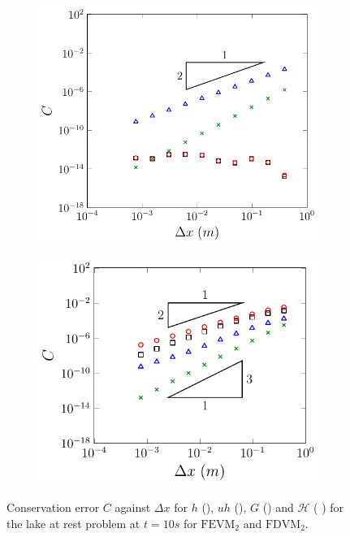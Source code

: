 \begin{figure}
\begin{subfigure}{0.5\textwidth}
		\vspace{0.5cm}
	\end{subfigure}
	\begin{subfigure}{0.5\textwidth}
		\includegraphics[width=\textwidth]{./chp5/figures/Analytic/LakeAtRest/C1/Ana/FDVM2WB.pdf}
	\end{subfigure}%
	\begin{subfigure}{0.5\textwidth}
		\includegraphics[width=\textwidth]{./chp5/figures/Analytic/LakeAtRest/C1/Ana/FDVM2nWB.pdf}
	\end{subfigure}
	\caption{Conservation error $C$ against $\Delta x$ for $h$ (), $uh$ (), $G$ () and $\mathcal{H}$ ({\color{green!60!black} }) for the lake at rest problem at $t=10s$ for $\text{FEVM}_2$ and $\text{FDVM}_2$.}
	\label{fig:LakeAtRestEC1}
\end{figure}

